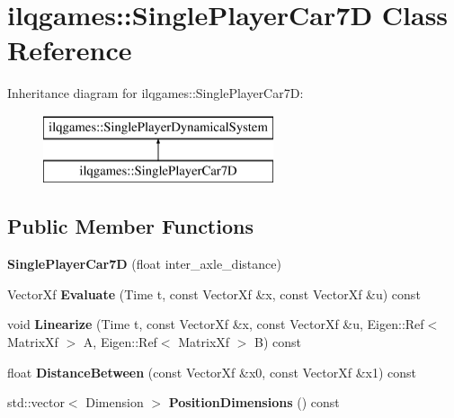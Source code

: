 \hypertarget{classilqgames_1_1_single_player_car7_d}{}\section{ilqgames\+:\+:Single\+Player\+Car7D Class Reference}
\label{classilqgames_1_1_single_player_car7_d}
Inheritance diagram for ilqgames\+:\+:Single\+Player\+Car7D\+:\begin{figure}[H]
\begin{center}
\leavevmode
\includegraphics[height=2.000000cm]{classilqgames_1_1_single_player_car7_d}
\end{center}
\end{figure}
\subsection*{Public Member Functions}
\begin{DoxyCompactItemize}
\item 
{\bfseries Single\+Player\+Car7D} (float inter\+\_\+axle\+\_\+distance)\hypertarget{classilqgames_1_1_single_player_car7_d_a31ca08f1230c5c180d8b1f55230f4c49}{}\label{classilqgames_1_1_single_player_car7_d_a31ca08f1230c5c180d8b1f55230f4c49}

\item 
Vector\+Xf {\bfseries Evaluate} (Time t, const Vector\+Xf \&x, const Vector\+Xf \&u) const \hypertarget{classilqgames_1_1_single_player_car7_d_a84d452cb5dd31f143d75def83a14f4c3}{}\label{classilqgames_1_1_single_player_car7_d_a84d452cb5dd31f143d75def83a14f4c3}

\item 
void {\bfseries Linearize} (Time t, const Vector\+Xf \&x, const Vector\+Xf \&u, Eigen\+::\+Ref$<$ Matrix\+Xf $>$ A, Eigen\+::\+Ref$<$ Matrix\+Xf $>$ B) const \hypertarget{classilqgames_1_1_single_player_car7_d_ac3eb66412e51ca5420d71a2aa2ad2bbc}{}\label{classilqgames_1_1_single_player_car7_d_ac3eb66412e51ca5420d71a2aa2ad2bbc}

\item 
float {\bfseries Distance\+Between} (const Vector\+Xf \&x0, const Vector\+Xf \&x1) const \hypertarget{classilqgames_1_1_single_player_car7_d_a409dce5e2bb27fabd19057fb5084187f}{}\label{classilqgames_1_1_single_player_car7_d_a409dce5e2bb27fabd19057fb5084187f}

\item 
std\+::vector$<$ Dimension $>$ {\bfseries Position\+Dimensions} () const \hypertarget{classilqgames_1_1_single_player_car7_d_a7fec02f8549442d4de84f89009de7c61}{}\label{classilqgames_1_1_single_player_car7_d_a7fec02f8549442d4de84f89009de7c61}

\end{DoxyCompactItemize}
